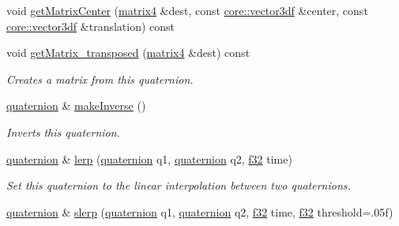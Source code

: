 \begin{DoxyCompactItemize}
void \hyperlink{classirr_1_1core_1_1quaternion_ab0ed43e2e137b42128a80f71f03dac44}{get\+Matrix\+Center} (\hyperlink{namespaceirr_1_1core_a4c9d4e29899535971052810954a14431}{matrix4} \&dest, const \hyperlink{namespaceirr_1_1core_ae6e2b2a6c552833ebbd5b7463d03586b}{core\+::vector3df} \&center, const \hyperlink{namespaceirr_1_1core_ae6e2b2a6c552833ebbd5b7463d03586b}{core\+::vector3df} \&translation) const
\item 
\mbox{\label{classirr_1_1core_1_1quaternion_abb660c84e6f51d7c5415c4eaf28a7bd2}} 
void \hyperlink{classirr_1_1core_1_1quaternion_abb660c84e6f51d7c5415c4eaf28a7bd2}{get\+Matrix\+\_\+transposed} (\hyperlink{namespaceirr_1_1core_a4c9d4e29899535971052810954a14431}{matrix4} \&dest) const
\begin{DoxyCompactList}\small\item\em Creates a matrix from this quaternion. \end{DoxyCompactList}\item 
\mbox{\label{classirr_1_1core_1_1quaternion_ae61eb93a6943453995b8faa7c650c624}} 
\hyperlink{classirr_1_1core_1_1quaternion}{quaternion} \& \hyperlink{classirr_1_1core_1_1quaternion_ae61eb93a6943453995b8faa7c650c624}{make\+Inverse} ()
\begin{DoxyCompactList}\small\item\em Inverts this quaternion. \end{DoxyCompactList}\item 
\hyperlink{classirr_1_1core_1_1quaternion}{quaternion} \& \hyperlink{classirr_1_1core_1_1quaternion_af778bb1c21ea4569f085f11b1860520f}{lerp} (\hyperlink{classirr_1_1core_1_1quaternion}{quaternion} q1, \hyperlink{classirr_1_1core_1_1quaternion}{quaternion} q2, \hyperlink{namespaceirr_a0277be98d67dc26ff93b1a6a1d086b07}{f32} time)
\begin{DoxyCompactList}\small\item\em Set this quaternion to the linear interpolation between two quaternions. \end{DoxyCompactList}\item 
\hyperlink{classirr_1_1core_1_1quaternion}{quaternion} \& \hyperlink{classirr_1_1core_1_1quaternion_a21c70f1253ef5eeab00723ea6b51717c}{slerp} (\hyperlink{classirr_1_1core_1_1quaternion}{quaternion} q1, \hyperlink{classirr_1_1core_1_1quaternion}{quaternion} q2, \hyperlink{namespaceirr_a0277be98d67dc26ff93b1a6a1d086b07}{f32} time, \hyperlink{namespaceirr_a0277be98d67dc26ff93b1a6a1d086b07}{f32} threshold=.\+05f)

\end{DoxyCompactItemize}
